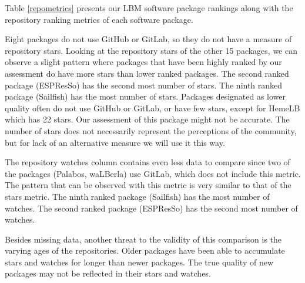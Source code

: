\documentclass[12pt, notitlepage]{article}
\begin{document}
Table \ref{repometrics} presents our LBM software package rankings along with the repository ranking metrics of each software package. 

Eight packages do not use GitHub or GitLab, so they do not have a measure of repository stars. Looking at the repository stars of the other 15 packages, we can observe a slight pattern where packages that have been highly ranked by our assessment do have more stars than lower ranked packages. The second ranked package (ESPResSo) has the second most number of stars. The ninth ranked package (Sailfish) has the most number of stars. Packages designated as lower quality often do not use GitHub or GitLab, or have few stars, except for HemeLB which has 22 stars. Our assessment of this package might not be accurate. The number of stars does not necessarily represent the perceptions of the community, but for lack of an alternative measure we will use it this way. 

The repository watches column contains even less data to compare since two of the packages (Palabos, waLBerla) use GitLab, which does not include this metric. The pattern that can be observed with this metric is very similar to that of the stars metric. The ninth ranked package (Sailfish) has the most number of watches. The second ranked package (ESPResSo) has the second most number of watches.

Besides missing data, another threat to the validity of this comparison is the varying ages of the repositories. Older packages have been able to accumulate stars and watches for longer than newer packages. The true quality of new packages may not be reflected in their stars and watches. \\
\end{document}
